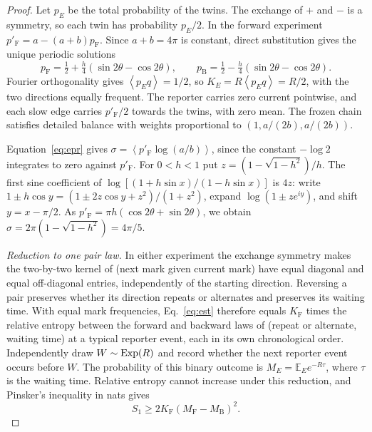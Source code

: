 \documentclass[11pt,a4paper]{article}
\newcommand{\av}[1]{\left\langle #1\right\rangle}
\newcommand{\F}{\mathrm F}
\newcommand{\B}{\mathrm B}
\begin{document}
\begin{proof}
Let $p_E$ be the total probability of the twins. The exchange of $+$ and $-$ is a symmetry, so each twin has probability $p_E/2$. In the forward experiment $p'_\F=a-(a+b)p_\F$. Since $a+b=4\pi$ is constant, direct substitution gives the unique periodic solutions
\[
 p_\F=\tfrac12+\tfrac h4(\sin 2\theta-\cos 2\theta),\qquad
 p_\B=\tfrac12-\tfrac h4(\sin 2\theta-\cos 2\theta).
\]
Fourier orthogonality gives $\av{p_E q}=1/2$, so $K_E=R\av{p_Eq}=R/2$, with the two directions equally frequent. The reporter carries zero current pointwise, and each slow edge carries $p'_\F/2$ towards the twins, with zero mean. The frozen chain satisfies detailed balance with weights proportional to $(1,a/(2b),a/(2b))$.

Equation~\eqref{eq:epr} gives $\sigma=\av{p'_\F\log(a/b)}$, since the constant $-\log 2$ integrates to zero against $p'_\F$. For $0<h<1$ put $z=(1-\sqrt{1-h^2})/h$. The first sine coefficient of $\log[(1+h\sin x)/(1-h\sin x)]$ is $4z$: write $1\pm h\cos y=(1\pm2z\cos y+z^2)/(1+z^2)$, expand $\log(1\pm ze^{iy})$, and shift $y=x-\pi/2$. As $p'_\F=\pi h(\cos 2\theta+\sin 2\theta)$, we obtain $\sigma=2\pi(1-\sqrt{1-h^2})=4\pi/5$.

\emph{Reduction to one pair law.} In either experiment the exchange symmetry makes the two-by-two kernel of (next mark given current mark) have equal diagonal and equal off-diagonal entries, independently of the starting direction. Reversing a pair preserves whether its direction repeats or alternates and preserves its waiting time. With equal mark frequencies, Eq.~\eqref{eq:est} therefore equals $K_\F$ times the relative entropy between the forward and backward laws of (repeat or alternate, waiting time) at a typical reporter event, each in its own chronological order. Independently draw $W\sim{\rm Exp}(R)$ and record whether the next reporter event occurs before $W$. The probability of this binary outcome is $M_E=\mathbb E_E e^{-R\tau}$, where $\tau$ is the waiting time. Relative entropy cannot increase under this reduction, and Pinsker's inequality in nats gives
\[
 S_1\geq 2K_\F(M_\F-M_\B)^2 .
\]


\end{proof}
\end{document}

